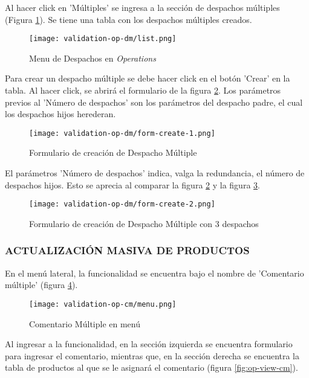 Al hacer click en 'Múltiples' se ingresa a la sección de despachos múltiples (Figura \ref{fig:op-list}).
Se tiene una tabla con los despachos múltiples creados.

\begin{figure}[H]
	\centering
	\texttt{[image: validation-op-dm/list.png]}
	\caption{\label{fig:op-list} Menu de Despachos en \textit{Operations}}
\end{figure}

Para crear un despacho múltiple se debe hacer click en el botón 'Crear' en la tabla. Al hacer click, se abrirá el formulario de la figura \ref{fig:op-form-create-1}.
Los parámetros previos al 'Número de despachos' son los parámetros del despacho padre, el cual los despachos hijos herederan.

\begin{figure}[H]
	\centering
	\texttt{[image: validation-op-dm/form-create-1.png]}
	\caption{\label{fig:op-form-create-1} Formulario de creación de Despacho Múltiple}
\end{figure}

El parámetros 'Número de despachos' indica, valga la redundancia, el número de despachos hijos. Esto se aprecia al comparar la figura \ref{fig:op-form-create-1} y la figura \ref{fig:op-form-create-2}.

\begin{figure}[H]
	\centering
	\texttt{[image: validation-op-dm/form-create-2.png]}
	\caption{\label{fig:op-form-create-2} Formulario de creación de Despacho Múltiple con 3 despachos}
\end{figure}

\subsubsection{ACTUALIZACIÓN MASIVA DE PRODUCTOS}

En el menú lateral, la funcionalidad se encuentra bajo el nombre de 'Comentario múltiple' (figura \ref{fig:op-menu-cm}).

\begin{figure}[H]
	\centering
	\texttt{[image: validation-op-cm/menu.png]}
	\caption{\label{fig:op-menu-cm} Comentario Múltiple en menú}
\end{figure}

Al ingresar a la funcionalidad, en la sección izquierda se encuentra formulario para ingresar el comentario, mientras que, en la sección derecha se encuentra la tabla de productos al que se le asignará el comentario (figura \ref{fig:op-view-cm}).

